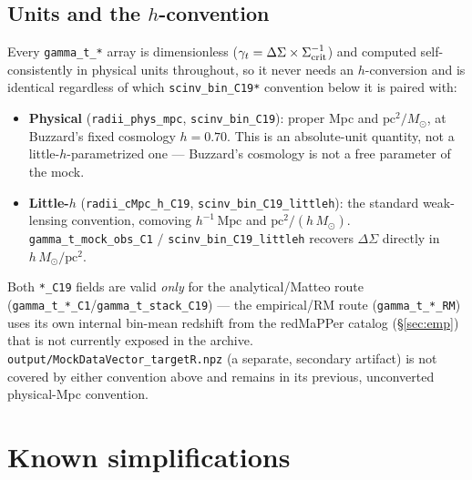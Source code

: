 \documentclass[a4paper, 11pt]{article}
\newcommand{\hMpc}{h^{-1}\,\mathrm{Mpc}}
\newcommand{\blk}[1]{\textcolor{datablockcol}{\texttt{#1}}}
\newcommand{\pyfile}[1]{{\small\texttt{#1}}}
\begin{document}
\subsection{Units and the $h$-convention}
\label{sec:units}

Every \blk{gamma\_t\_*} array is dimensionless
($\gamma_t = \Delta\Sigma \times \Sigma_{\rm crit}^{-1}$) and computed
self-consistently in physical units throughout, so it never needs an
$h$-conversion and is identical regardless of which \blk{scinv\_bin\_C19*}
convention below it is paired with:
\begin{itemize}
  \setlength\itemsep{2pt}
  \item \textbf{Physical} (\blk{radii\_phys\_mpc}, \blk{scinv\_bin\_C19}):
    proper Mpc and $\mathrm{pc}^2/M_\odot$, at Buzzard's fixed cosmology
    $h = 0.70$. This is an absolute-unit quantity, not a
    little-$h$-parametrized one --- Buzzard's cosmology is not a free
    parameter of the mock.
  \item \textbf{Little-$h$} (\blk{radii\_cMpc\_h\_C19},
    \blk{scinv\_bin\_C19\_littleh}): the standard weak-lensing convention,
    comoving $\hMpc$ and $\mathrm{pc}^2/(h\,M_\odot)$.
    \blk{gamma\_t\_mock\_obs\_C1} $/$ \blk{scinv\_bin\_C19\_littleh}
    recovers $\Delta\Sigma$ directly in $h\,M_\odot/\mathrm{pc}^2$.
\end{itemize}
Both \blk{*\_C19} fields are valid \emph{only} for the analytical/Matteo
route (\blk{gamma\_t\_*\_C1}/\blk{gamma\_t\_stack\_C19}) --- the
empirical/RM route (\blk{gamma\_t\_*\_RM}) uses its own internal bin-mean
redshift from the redMaPPer catalog (\S\ref{sec:emp}) that is not
currently exposed in the archive. \pyfile{output/MockDataVector\_targetR.npz}
(a separate, secondary artifact) is not covered by either convention above
and remains in its previous, unconverted physical-Mpc convention.

\section{Known simplifications}
\label{sec:future}
\end{document}
